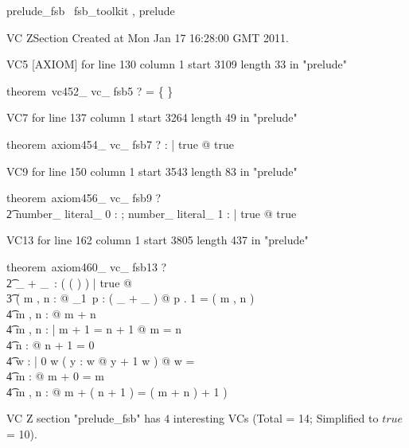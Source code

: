 \documentclass{article}
\begin{document}

\begin{zsection}
	 \SECTION prelude\_fsb \parents~fsb\_toolkit , prelude
\end{zsection}

VC ZSection Created at Mon Jan 17 16:28:00 GMT 2011.

VC5 [AXIOM] for line 130 column 1 start 3109 length 33 in "prelude"
\begin{zed}
theorem~vc452\_ vc\_ fsb5 \vdash ? \lnot \arithmos = \{ \}
\end{zed}

VC7 for line 137 column 1 start 3264 length 49 in "prelude"
\begin{zed}
theorem~axiom454\_ vc\_ fsb7 \vdash ? \exists \nat : \power \arithmos | true @ true
\end{zed}

VC9 for line 150 column 1 start 3543 length 83 in "prelude"
\begin{zed}
theorem~axiom456\_ vc\_ fsb9 \vdash ? \\
   \t2 \exists number\_ literal\_ 0 : \nat ; number\_ literal\_ 1 : \nat | true @ true
\end{zed}

VC13 for line 162 column 1 start 3805 length 437 in "prelude"
\begin{zed}
theorem~axiom460\_ vc\_ fsb13 \vdash ? \\
   \t2 \exists \_ + \_~: \power ( ( \arithmos \cross \arithmos ) \cross \arithmos ) | true @ \\
    \t3 ( \forall m , n : \nat @ {\exists}_{1}~p : ( \_ + \_ ) @ p . 1 = ( m , n ) \\
     \t4 \forall m , n : \nat @ m + n \in \nat \\
     \t4 \forall m , n : \nat | m + 1 = n + 1 @ m = n \\
     \t4 \forall n : \nat @ \lnot n + 1 = 0 \\
     \t4 \forall w : \power \nat | 0 \in w \land ( \forall y : w @ y + 1 \in w ) @ w = \nat \\
     \t4 \forall m : \nat @ m + 0 = m \\
     \t4 \forall m , n : \nat @ m + ( n + 1 ) = ( m + n ) + 1 )
\end{zed}



 VC Z section "prelude_fsb" has $4$ interesting VCs (Total = 14; Simplified to $true$ = 10).



\end{document}
